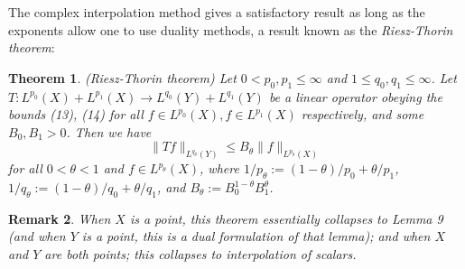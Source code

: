 \documentclass[10pt,reqno]{amsart}
\newtheorem{theorem}{Theorem}
\newtheorem{remark}[theorem]{Remark}
\begin{document}
The complex interpolation method gives a satisfactory result as long as the exponents allow one to use duality methods, a result known as the \emph{Riesz-Thorin theorem}:

\begin{theorem} (Riesz-Thorin theorem) Let $0 < p_0,p_1 \leq \infty$ and $1 \leq q_0,q_1 \leq \infty$. Let $T: L^{p_0}(X) + L^{p_1}(X) \rightarrow L^{q_0}(Y) + L^{q_1}(Y)$ be a linear operator obeying the bounds (13), (14) for all $f \in L^{p_0}(X), f \in L^{p_1}(X)$ respectively, and some $B_0, B_1 > 0$. Then we have
    \[     \| T f \|_{L^{q_\theta}(Y)} \leq B_\theta \| f\|_{L^{p_\theta}(X)}\]
    for all $0 < \theta < 1$ and $f \in L^{p_\theta}(X)$, where $1/p_\theta := (1-\theta)/p_0 + \theta/p_1$, $1/q_\theta := (1-\theta)/q_0 + \theta/q_1$, and $B_\theta := B_0^{1-\theta} B_1^\theta$. 
\end{theorem}

\begin{remark}
    When $X$ is a point, this theorem essentially collapses to Lemma 9 (and when $Y$ is a point, this is a dual formulation of that lemma); and when $X$ and $Y$ are both points; this collapses to interpolation of scalars. 
\end{remark}
\end{document}
